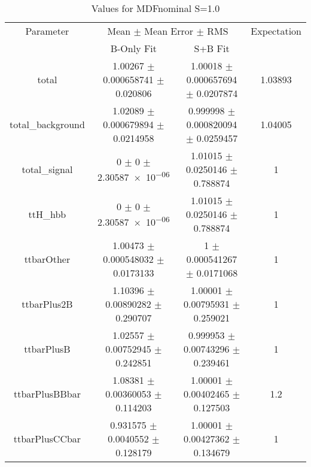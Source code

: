 \begin{table}
\centering
\caption{Values for MDFnominal S=1.0}
\begin{tabular}{cccc}
\toprule
Parameter & \multicolumn{2}{c}{Mean $\pm$ Mean Error $\pm$ RMS} & Expectation\\
 & B-Only Fit & S+B Fit & \\
\midrule
total & \num{1.00267} $\pm$ \num{0.000658741} $\pm$ \num{0.020806} & \num{1.00018} $\pm$ \num{0.000657694} $\pm$ \num{0.0207874} & \num{1.03893}\\
total\_background & \num{1.02089} $\pm$ \num{0.000679894} $\pm$ \num{0.0214958} & \num{0.999998} $\pm$ \num{0.000820094} $\pm$ \num{0.0259457} & \num{1.04005}\\
total\_signal & \num{0} $\pm$ \num{0} $\pm$ \num{2.30587e-06} & \num{1.01015} $\pm$ \num{0.0250146} $\pm$ \num{0.788874} & \num{1}\\
ttH\_hbb & \num{0} $\pm$ \num{0} $\pm$ \num{2.30587e-06} & \num{1.01015} $\pm$ \num{0.0250146} $\pm$ \num{0.788874} & \num{1}\\
ttbarOther & \num{1.00473} $\pm$ \num{0.000548032} $\pm$ \num{0.0173133} & \num{1} $\pm$ \num{0.000541267} $\pm$ \num{0.0171068} & \num{1}\\
ttbarPlus2B & \num{1.10396} $\pm$ \num{0.00890282} $\pm$ \num{0.290707} & \num{1.00001} $\pm$ \num{0.00795931} $\pm$ \num{0.259021} & \num{1}\\
ttbarPlusB & \num{1.02557} $\pm$ \num{0.00752945} $\pm$ \num{0.242851} & \num{0.999953} $\pm$ \num{0.00743296} $\pm$ \num{0.239461} & \num{1}\\
ttbarPlusBBbar & \num{1.08381} $\pm$ \num{0.00360053} $\pm$ \num{0.114203} & \num{1.00001} $\pm$ \num{0.00402465} $\pm$ \num{0.127503} & \num{1.2}\\
ttbarPlusCCbar & \num{0.931575} $\pm$ \num{0.0040552} $\pm$ \num{0.128179} & \num{1.00001} $\pm$ \num{0.00427362} $\pm$ \num{0.134679} & \num{1}\\
\bottomrule
\end{tabular}
\end{table}